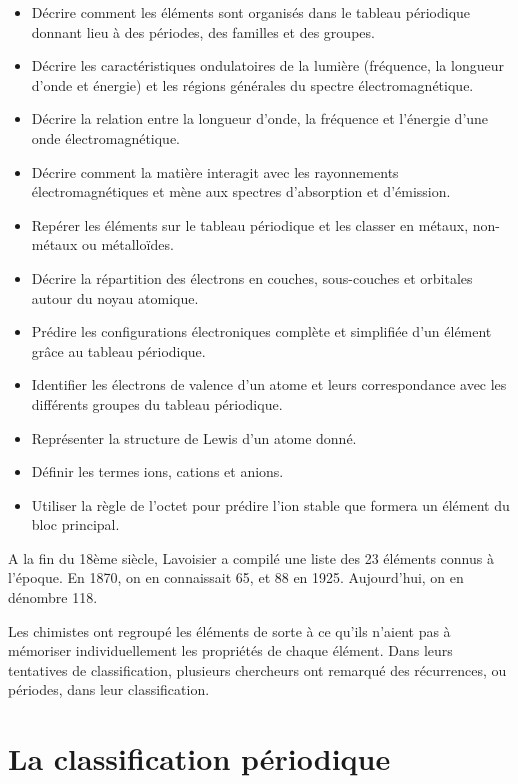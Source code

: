 \documentclass[
  11pt,
  a4paper,
  openany]{book}
\providecommand{\tightlist}{%
  \setlength{\itemsep}{0pt}\setlength{\parskip}{0pt}}
\begin{document}
\begin{objectives}

\begin{itemize}
\tightlist
\item
  Décrire comment les éléments sont organisés dans le tableau périodique donnant lieu à des périodes, des familles et des groupes.
\item
  Décrire les caractéristiques ondulatoires de la lumière (fréquence, la longueur d'onde et énergie) et les régions générales du spectre électromagnétique.
\item
  Décrire la relation entre la longueur d'onde, la fréquence et l'énergie d'une onde électromagnétique.
\item
  Décrire comment la matière interagit avec les rayonnements électromagnétiques et mène aux spectres d'absorption et d'émission.
\item
  Repérer les éléments sur le tableau périodique et les classer en métaux, non-métaux ou métalloïdes.
\item
  Décrire la répartition des électrons en couches, sous-couches et orbitales autour du noyau atomique.
\item
  Prédire les configurations électroniques complète et simplifiée d'un élément grâce au tableau périodique.
\item
  Identifier les électrons de valence d'un atome et leurs correspondance avec les différents groupes du tableau périodique.
\item
  Représenter la structure de Lewis d'un atome donné.
\item
  Définir les termes ions, cations et anions.
\item
  Utiliser la règle de l'octet pour prédire l'ion stable que formera un élément du bloc principal.
\end{itemize}

\end{objectives}

A la fin du 18ème siècle, Lavoisier a compilé une liste des 23 éléments connus à l'époque. En 1870, on en connaissait 65, et 88 en 1925. Aujourd'hui, on en dénombre 118.

Les chimistes ont regroupé les éléments de sorte à ce qu'ils n'aient pas à mémoriser individuellement les propriétés de chaque élément. Dans leurs tentatives de classification, plusieurs chercheurs ont remarqué des récurrences, ou périodes, dans leur classification.

\hypertarget{la-classification-puxe9riodique}{%
\section{La classification périodique}\label{la-classification-puxe9riodique}}
\end{document}
